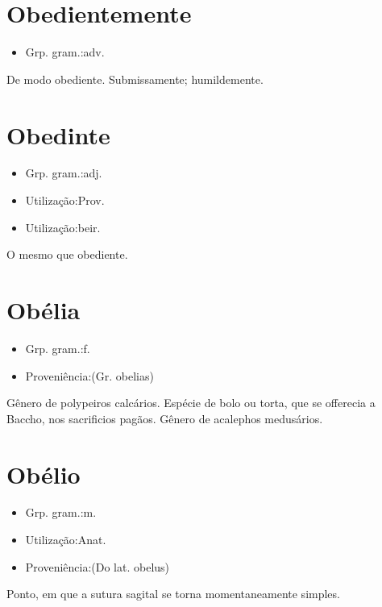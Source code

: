 \section{Obedientemente}
\begin{itemize}
\item {Grp. gram.:adv.}
\end{itemize}
De modo obediente.
Submissamente; humildemente.
\section{Obedinte}
\begin{itemize}
\item {Grp. gram.:adj.}
\end{itemize}
\begin{itemize}
\item {Utilização:Prov.}
\end{itemize}
\begin{itemize}
\item {Utilização:beir.}
\end{itemize}
O mesmo que \textunderscore obediente\textunderscore .
\section{Obélia}
\begin{itemize}
\item {Grp. gram.:f.}
\end{itemize}
\begin{itemize}
\item {Proveniência:(Gr. \textunderscore obelias\textunderscore )}
\end{itemize}
Gênero de polypeiros calcários.
Espécie de bolo ou torta, que se offerecia a Baccho, nos sacrificios pagãos.
Gênero de acalephos medusários.
\section{Obélio}
\begin{itemize}
\item {Grp. gram.:m.}
\end{itemize}
\begin{itemize}
\item {Utilização:Anat.}
\end{itemize}
\begin{itemize}
\item {Proveniência:(Do lat. \textunderscore obelus\textunderscore )}
\end{itemize}
Ponto, em que a sutura sagital se torna momentaneamente simples.
